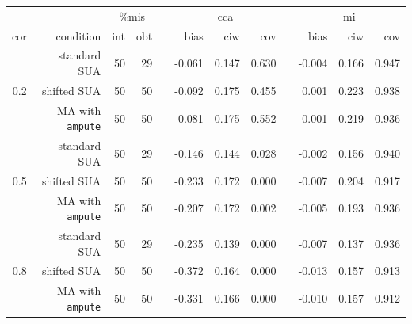 \documentclass[11pt,a4paper]{article}
\newcommand{\code}[1]{\texttt{#1}}
\begin{document}
\begin{table}[h!]
\begin{subtable}{1\textwidth}
\centering
\captionsetup{justification=justified,singlelinecheck=false,width = 0.93\textwidth}
  \label{sim2a}
\begin{tabular}{rrrrrrrrrrrr}
\hline
&& \multicolumn{2}{c}{\%mis} && \multicolumn{3}{c}{cca} && \multicolumn{3}{c}{mi} \\
\cline{3-4} \cline{6-8} \cline{10-12}
cor & condition & int & obt & & bias & ciw & cov & & bias & ciw & cov \\ 
\hline
 & standard SUA & 50 & 29 &  & -0.061 & 0.147 & 0.630 &  & -0.004 & 0.166 & 0.947 \\ 
  0.2 & shifted SUA & 50 & 50 &  & -0.092 & 0.175 & 0.455 &  & 0.001 & 0.223 & 0.938 \\ 
   & MA with \code{ampute} & 50 & 50 &  & -0.081 & 0.175 & 0.552 &  & -0.001 & 0.219 & 0.936 \\ 
   \cline{2-12}
   & standard SUA & 50 & 29 &  & -0.146 & 0.144 & 0.028 &  & -0.002 & 0.156 & 0.940 \\ 
  0.5 & shifted SUA & 50 & 50 &  & -0.233 & 0.172 & 0.000 &  & -0.007 & 0.204 & 0.917 \\ 
   & MA with \code{ampute} & 50 & 50 &  & -0.207 & 0.172 & 0.002 &  & -0.005 & 0.193 & 0.936 \\ 
   \cline{2-12}
   & standard SUA & 50 & 29 &  & -0.235 & 0.139 & 0.000 &  & -0.007 & 0.137 & 0.936 \\ 
  0.8 & shifted SUA & 50 & 50 &  & -0.372 & 0.164 & 0.000 &  & -0.013 & 0.157 & 0.913 \\ 
   & MA with \code{ampute} & 50 & 50 &  & -0.331 & 0.166 & 0.000 &  & -0.010 & 0.157 & 0.912 \\ 
   \hline
\end{tabular}
\vspace{2mm}
\captionsetup{justification=justified,singlelinecheck=false,width = 0.93\textwidth}
  \end{subtable}

\end{table}
\end{document}
